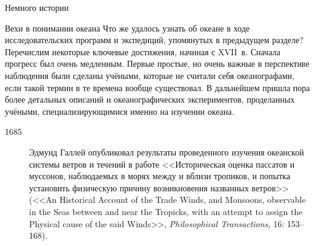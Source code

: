 \begin{chapter}{Немного истории}
\begin{section}{Вехи в понимании океана}
Что же удалось узнать об океане в ходе исследовательских программ и
экспедиций, упомянутых в предыдущем разделе? Перечислим некоторые ключевые
достижения, начиная с XVII~в. Сначала прогресс
был очень медленным. Первые простые, но очень важные в перспективе
наблюдения были сделаны учёными, которые не считали себя океанографами, 
если такой термин в те времена вообще существовал. 
В дальнейшем пришла пора более детальных описаний и океанографических 
экспериментов, проделанных учёными, специализирующимися
именно на изучении океана. 
%





\begin{description}
\item[1685] Эдмунд Галлей опубликовал результаты проведенного
изучения океанской системы ветров и течений в работе <<Историческая оценка 
пассатов и муссонов, наблюдаемых в морях между и вблизи тропиков, 
и попытка установить физическую причину возникновения
названных ветров>> (<<An Historical Account of the Trade Winds, and
Monsoons, observable in the Seas between and near the Tropicks, with
an attempt to assign the Physical cause of the said Winds>>, 
\textsl{Philosophical Transactions,} 16: 153--168).
%


\end{description}
\end{section}
\end{chapter}
